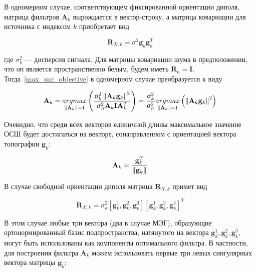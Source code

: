 В одномерном случае, соответствующем фиксированной ориентации диполя,
матрица фильтров $\mathbf{A}_k$ вырождается в вектор-строку,
а матрица ковариации для источника с индексом $k$ приобретает вид

\begin{equation}
    \mathbf{R}_{X,k} = \sigma^2 \mathbf{g}_k \mathbf{g}_k^T
\end{equation}

где $\sigma^2_k$ --- дисперсия сигнала.
Для матрицы ковариации шума в предположении, что он является пространственно белым, 
будем иметь $\mathbf{R}_n = \mathbf{I}$.
Тогда~\ref{max_snr_objective} в одномерном случае преобразуется к виду

\begin{equation}
    \mathbf{A}_k =
        \underset{\left\lVert\mathbf{A}_k\right\rVert = 1}{argmax}\left(
            \frac{\upsigma_k^2\left\lVert\mathbf{A}_k \mathbf{g}_k\right\rVert^2}
                 {\upsigma_n^2\mathbf{A}_k \mathbf{I} \mathbf{A}_k^T}
             \right) = \frac{\upsigma_k^2}{\upsigma_n^2}\underset{\left\lVert\mathbf{A}_k\right\rVert = 1}{argmax}\left(
                \left\lVert\mathbf{A}_k \mathbf{g}_k\right\rVert^2
             \right)
\end{equation}


Очевидно, что среди всех векторов единичной длины максимальное значение ОСШ
будет достигаться на векторе, сонаправленном с ориентацией вектора топографии $\mathbf{g}_k$:

\begin{equation}
    \mathbf{A}_k = \frac{\mathbf{g}_k^T}{\left\lVert\mathbf{g}_k\right\rVert}
\end{equation}

В случае свободной ориентации диполя матрица $\mathbf{R}_{X,k}$ примет вид

\begin{equation}
    \mathbf{R}_{X,k} = \sigma_k^2 \left[
            \mathbf{g}_k^1, \mathbf{g}_k^2, \mathbf{g}_k^3 \right]
        {\left[\mathbf{g}_k^1, \mathbf{g}_k^2, \mathbf{g}_k^3\right]}^T
\end{equation}

В этом случае любые три вектора (два в случае МЭГ),
образующие ортонормированный базис подпространства, натянутого на
вектора $\mathbf{g}_k^1, \mathbf{g}_k^2, \mathbf{g}_k^3$,
могут быть использованы как компоненты оптимального фильтра.
В частности, для построения фильтра $\mathbf{A}_k$ можем использовать
первые три левых сингулярных вектора матрицы $\mathbf{g}_k$:

